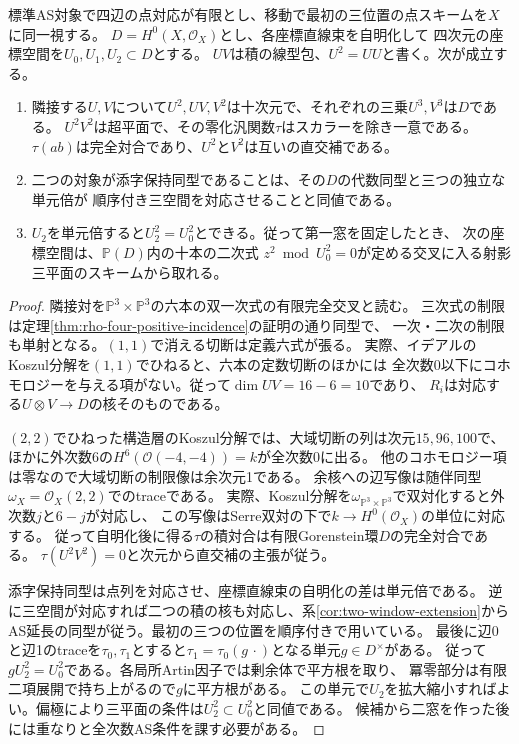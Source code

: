 \begin{theorem}[三つの座標空間からの復元と平方の直交]\label{thm:finite-square-chart}
標準AS対象で四辺の点対応が有限とし、移動で最初の三位置の点スキームを$X$に同一視する。
$D=H^0(X,\mathcal O_X)$とし、各座標直線束を自明化して
四次元の座標空間を$U_0,U_1,U_2\subset D$とする。
$UV$は積の線型包、$U^2=UU$と書く。次が成立する。
\begin{enumerate}
\item 隣接する$U,V$について$U^2,UV,V^2$は十次元で、それぞれの三乗$U^3,V^3$は$D$である。
$U^2 V^2$は超平面で、その零化汎関数$\tau$はスカラーを除き一意である。
$\tau(ab)$は完全対合であり、$U^2$と$V^2$は互いの直交補である。
\item 二つの対象が添字保持同型であることは、その$D$の代数同型と三つの独立な単元倍が
順序付き三空間を対応させることと同値である。
\item $U_2$を単元倍すると$U_2^2=U_0^2$とできる。従って第一窓を固定したとき、
次の座標空間は、$\mathbb P(D)$内の十本の二次式
$z^2\bmod U_0^2=0$が定める交叉に入る射影三平面のスキームから取れる。
\end{enumerate}
\end{theorem}
\begin{proof}
隣接対を$\mathbb P^3\times\mathbb P^3$の六本の双一次式の有限完全交叉と読む。
三次式の制限は定理\ref{thm:rho-four-positive-incidence}の証明の通り同型で、
一次・二次の制限も単射となる。$(1,1)$で消える切断は定義六式が張る。
実際、イデアルのKoszul分解を$(1,1)$でひねると、六本の定数切断のほかには
全次数0以下にコホモロジーを与える項がない。従って$\dim UV=16-6=10$であり、
$R_i$は対応する$U\otimes V\to D$の核そのものである。

$(2,2)$でひねった構造層のKoszul分解では、大域切断の列は次元$15,96,100$で、
ほかに外次数6の$H^6(\mathcal O(-4,-4))=k$が全次数0に出る。
他のコホモロジー項は零なので大域切断の制限像は余次元1である。
余核への辺写像は随伴同型$\omega_X=\mathcal O_X(2,2)$でのtraceである。
実際、Koszul分解を$\omega_{\mathbb P^3\times\mathbb P^3}$で双対化すると外次数$j$と$6-j$が対応し、
この写像はSerre双対の下で$k\to H^0(\mathcal O_X)$の単位に対応する。
従って自明化後に得る$\tau$の積対合は有限Gorenstein環$D$の完全対合である。
$\tau(U^2 V^2)=0$と次元から直交補の主張が従う。

添字保持同型は点列を対応させ、座標直線束の自明化の差は単元倍である。
逆に三空間が対応すれば二つの積の核も対応し、系\ref{cor:two-window-extension}から
AS延長の同型が従う。最初の三つの位置を順序付きで用いている。
最後に辺0と辺1のtraceを$\tau_0,\tau_1$とすると$\tau_1=\tau_0(g\,\cdot)$となる単元$g\in D^\times$がある。
従って$g U_2^2=U_0^2$である。各局所Artin因子では剰余体で平方根を取り、
冪零部分は有限二項展開で持ち上がるので$g$に平方根がある。
この単元で$U_2$を拡大縮小すればよい。偏極により三平面の条件は$U_2^2\subset U_0^2$と同値である。
候補から二窓を作った後には重なりと全次数AS条件を課す必要がある。
\end{proof}

